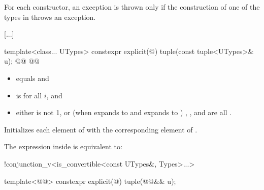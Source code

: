 \documentclass{wg21}
\begin{document}
\pnum
For each  constructor, an exception is thrown only if the construction of
one of the types in  throws an exception.

[...]


%
\begin{itemdecl}
template<class... UTypes>
constexpr explicit(@\seebelow@) tuple(const tuple<UTypes>& u);
@@
@@
\end{itemdecl}

\begin{itemdescr}
    \pnum
    \constraints
    \begin{itemize}
        \item
         equals  and

        \item
         is  for all $i$, and

        \item
        either
         is not 1, or
        (when  expands to  and  expands to )
        , , and  are all .
    \end{itemize}

    \pnum
    \effects
    Initializes each element of 
    with the corresponding element of .

    \pnum
    \remarks
    The expression inside  is equivalent to:
    \begin{codeblock}
        !conjunction_v<is_convertible<const UTypes&, Types>...>
    \end{codeblock}
\end{itemdescr}

%
\begin{itemdecl}
template<@@>
constexpr explicit(@\seebelow@) tuple(@@&& u);
\end{itemdecl}
\end{document}
